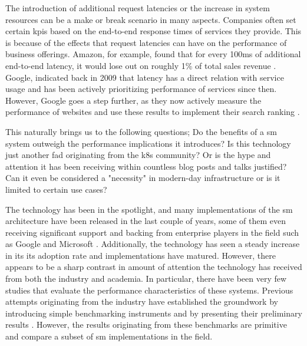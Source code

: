 The introduction of additional request latencies or the increase in system resources can be a make or break scenario in many aspects. Companies often set certain \glspl{kpi} based on the end-to-end response times of services they provide. This is because of the effects that request latencies can have on the performance of business offerings. Amazon, for example, found that for every 100ms of additional end-to-end latency, it would lose out on roughly 1\% of total sales revenue \cite{amazon-latency-conversion-drop}. Google, indicated back in 2009 \cite{google-latency-bounce-rate} that latency has a direct relation with service usage and has been actively prioritizing performance of services since then. However, Google goes a step further, as they now actively measure the performance of websites and use these results to implement their search ranking \cite{google-search-index-perf}. 

This naturally brings us to the following questions; Do the benefits of a \gls{sm} system outweigh the performance implications it introduces? Is this technology just another fad originating from the \gls{k8s} community? Or is the hype  \cite{hashicorp-sm-hype} and attention it has been receiving within countless blog posts and talks justified? Can it even be considered a "necessity" \cite{sm-kubernetes-necessity} in modern-day infrastructure or is it limited to certain use cases?

The technology has been in the spotlight, and many implementations of the \gls{sm} architecture have been released in the last couple of years, some of them even receiving significant support and backing from enterprise players in the field such as Google and Microsoft \cite{cncf-sm-landscape}. Additionally, the technology has seen a steady increase in its  its adoption rate \cite{cncf-survey-2020, rh-survey} and implementations have matured. However, there appears to be a sharp contrast in amount of attention the technology has received from both the industry and academia. In particular, there have been very few studies that evaluate the performance characteristics of these systems. Previous attempts originating from the industry have established the groundwork by introducing simple benchmarking instruments \cite{kinvolk-bench} and by presenting their preliminary results \cite{bench-istio-linkerd-2019, bench-istio-linkerd-2021}. However, the results originating from these benchmarks are primitive and compare a subset of \gls{sm} implementations in the field.
